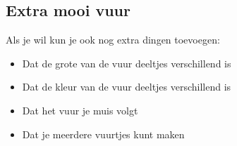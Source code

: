 \documentclass{../qh_exercise}
\begin{document}
\subsection{Extra mooi vuur}
Als je wil kun je ook nog extra dingen toevoegen:
\begin{itemize}
    \item Dat de grote van de vuur deeltjes verschillend is
    \item Dat de kleur van de vuur deeltjes verschillend is
    \item Dat het vuur je muis volgt
    \item Dat je meerdere vuurtjes kunt maken
\end{itemize}
\end{document}
